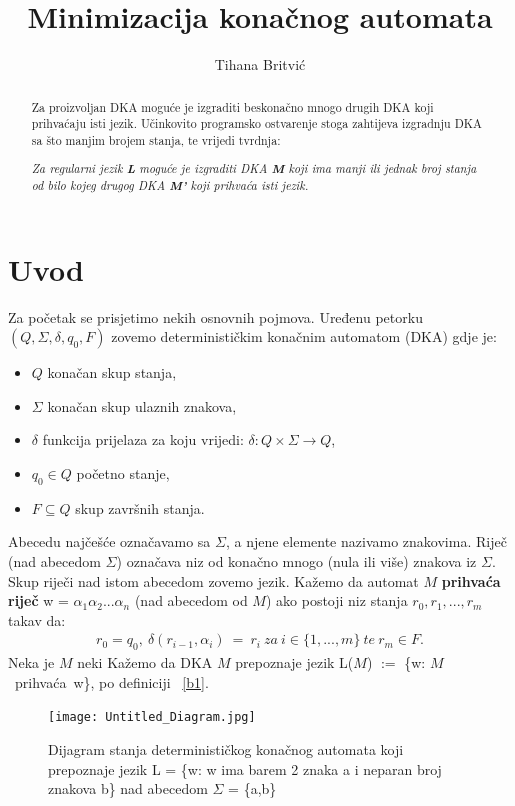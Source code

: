 \documentclass[titlepage]{article}
\title{Minimizacija konačnog automata}
\author{Tihana Britvić}
\begin{document}
\newtheorem{thm}{Teorem}
\newtheorem{corollary}{Korolar}[thm]


\maketitle
\renewcommand{\figurename}{Slika}
\renewcommand{\abstractname}{Motivacija}
\renewcommand*\contentsname{Sadržaj}
\newpage
\tableofcontents
\newpage
\begin{abstract}
Za proizvoljan DKA moguće je izgraditi beskonačno mnogo drugih DKA koji prihvaćaju isti jezik. Učinkovito programsko ostvarenje stoga zahtijeva izgradnju DKA sa što manjim brojem stanja, te vrijedi tvrdnja: 
\begin{center}
\textit{
Za regularni jezik \textbf{L} moguće je izgraditi DKA \textbf{M} koji ima manji ili jednak broj stanja od bilo kojeg drugog DKA \textbf{M'} koji prihvaća isti jezik. 
}
\end{center}
\end{abstract}
\section{Uvod}
Za početak se prisjetimo nekih osnovnih pojmova. Uređenu petorku  $(Q, \Sigma, \delta, q_0, F)$ zovemo determinističkim konačnim automatom (DKA) gdje je:
\begin{itemize}
\item $Q$ konačan skup stanja, 
\item $\Sigma$ konačan skup ulaznih znakova, 
\item $\delta$ funkcija prijelaza za koju vrijedi: $\delta : Q \times \Sigma \rightarrow Q$, 
\item $q_0 \in Q$ početno stanje,
\item $F \subseteq Q$ skup završnih stanja. 
\end{itemize}
Abecedu najčešće označavamo sa $\Sigma$, a njene elemente nazivamo znakovima. Riječ (nad abecedom $\Sigma$) označava niz od konačno mnogo (nula ili više) znakova iz $\Sigma$. Skup riječi nad istom abecedom zovemo jezik. Kažemo da automat $M$ \textbf{prihvaća riječ} w = $\alpha _1 \alpha _2 ... \alpha _n$ (nad abecedom od $M$) ako postoji niz stanja $r_0, r_1, ..., r_m$ takav da: 
\begin{align}
    r_0 = q_0,\ \delta (r_{i-1}, \alpha _i)\ =\ r_i \ za \ i \in \{1, ..., m\} \ te \ r_m \in F.  \label{b1}
\end{align}
Neka je $M$ neki  Kažemo da DKA $M$ prepoznaje jezik L($M$) $:=$ \{w: $M$ \ prihvaća\ w\}, po definiciji ~\eqref{b1}.
\begin{figure}[h]
\centering
\texttt{[image: Untitled\_Diagram.jpg]}
\caption{Dijagram stanja determinističkog konačnog automata koji prepoznaje jezik L = \{w: w ima barem 2 znaka a i neparan broj znakova b\} nad abecedom $\Sigma$ = \{a,b\} 
}
\end{figure}
\end{document}

